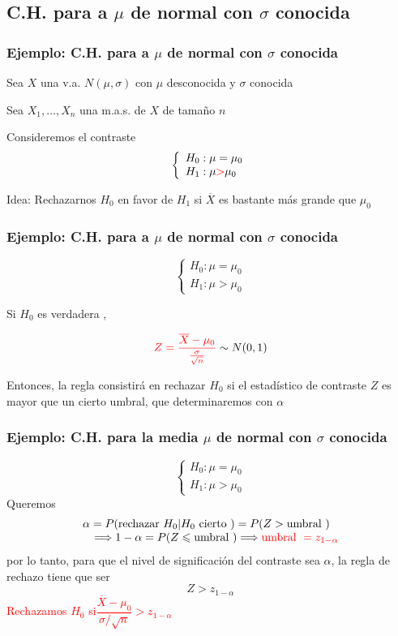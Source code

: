 \documentclass[12pt,t]{beamer}\usepackage[]{graphicx}\usepackage[]{color}
\newcommand{\red}[1]{\textcolor{red}{#1}}
\renewcommand{\emph}[1]{{\color{red}#1}}
\renewcommand{\leq}{\leqslant}
\theoremstyle{plain}
\theoremstyle{definition}
\begin{document}
\subsection{C.H. para a $\mu$ de normal con $\sigma$ conocida}
\begin{frame}
\frametitle{Ejemplo: C.H. para a $\mu$ de normal con $\sigma$ conocida}

Sea $X$ una v.a. $N(\mu,\sigma)$ con $\mu$ desconocida y $\sigma$ conocida
\medskip


Sea  $X_{1},\ldots,X_{n}$ una m.a.s. de $X$ de tamaño $n$
\medskip

Consideremos  el contraste  
$$
\left\{\begin{array}{l}
H_{0}:\mu=\mu_{0}\\ H_{1}:\mu\red{>}\mu_{0}
\end{array}
\right.
$$
\medskip

Idea: Rechazarnos $H_0$ en favor de $H_1$ si $\overline{X}$ es \emph{bastante más grande} que $\mu_0$

\end{frame}

\begin{frame}
\frametitle{Ejemplo: C.H. para a $\mu$ de normal con $\sigma$ conocida}

$$
\left\{\begin{array}{l}
H_{0}:\mu=\mu_{0}\\ H_{1}:\mu>\mu_{0}
\end{array}
\right.
$$

Si $H_0$ es verdadera  ,

$$
\red{Z=\frac{\overline{X}-\mu_{0}}{\frac{\sigma}{\sqrt{n}}}}\sim N(0,1)
$$

Entonces, la regla consistirá en  rechazar   $H_{0}$ si el \emph{estadístico de contraste} $Z$ es mayor que un
cierto umbral, que determinaremos con $\alpha$
\end{frame}

\begin{frame}
\frametitle{Ejemplo: C.H. para la media $\mu$ de normal con $\sigma$ conocida}
\vspace*{-0.75cm}

$$
\left\{\begin{array}{l}
H_{0}:\mu=\mu_{0}\\ H_{1}:\mu>\mu_{0}
\end{array}
\right.
$$
Queremos
$$
\begin{array}{l}
\alpha =P(\mbox{rechazar   } H_{0}| H_{0} \mbox{ cierto })=P(Z>\mbox{umbral  })\\
\quad \Longrightarrow 1-\alpha= P(Z\leq \mbox{umbral  })\Longrightarrow \red{\mbox{umbral  }=z_{1-\alpha}}
\end{array}
$$
por lo  tanto,  para que el nivel de significación del contraste sea $\alpha$,  la regla de rechazo tiene que ser
$$
Z>z_{1-\alpha}
$$
\red{Rechazamos $H_0$ si\quad $\dfrac{\overline{X}-\mu_{0}}{\sigma/\sqrt{n}}>z_{1-\alpha}$}


\end{frame}
\end{document}
